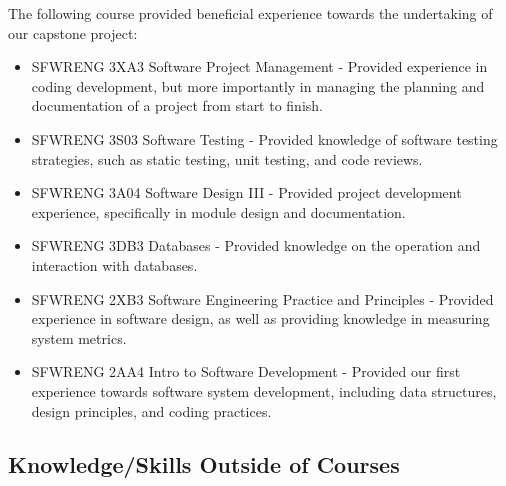 \documentclass{article}
\begin{document}
The following course provided beneficial experience towards the undertaking of our capstone project:
\begin{itemize}
	\item SFWRENG 3XA3 Software Project Management - Provided experience in coding development, but more importantly in managing the planning and documentation of a project from start to finish.
	\item SFWRENG 3S03 Software Testing - Provided knowledge of software testing strategies, such as static testing, unit testing, and code reviews.
	\item SFWRENG 3A04 Software Design III - Provided project development experience, specifically in module design and documentation.
	\item SFWRENG 3DB3 Databases - Provided knowledge on the operation and interaction with databases.
	\item SFWRENG 2XB3 Software Engineering Practice and Principles - Provided experience in software design, as well as providing knowledge in measuring system metrics.
	\item SFWRENG 2AA4 Intro to Software Development - Provided our first experience towards software system development, including data structures, design principles, and coding practices.
\end{itemize}

\subsection{Knowledge/Skills Outside of Courses}

\end{document}
